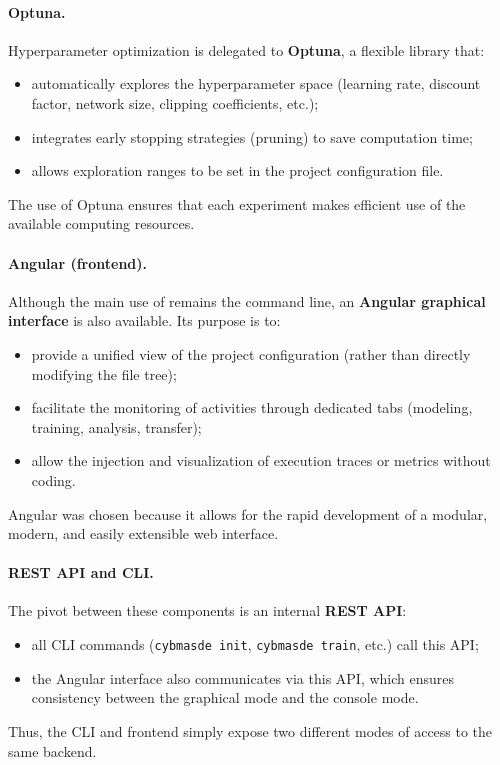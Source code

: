 \paragraph{Optuna.}
Hyperparameter optimization is delegated to \textbf{Optuna}, a flexible library that:
\begin{itemize}
  \item automatically explores the hyperparameter space (learning rate, discount factor, network size, clipping coefficients, etc.);
  \item integrates early stopping strategies (pruning) to save computation time;
  \item allows exploration ranges to be set in the project configuration file.
\end{itemize}
The use of Optuna ensures that each experiment makes efficient use of the available computing resources.

\paragraph{Angular (frontend).}
Although the main use of  remains the command line, an \textbf{Angular graphical interface} is also available.
Its purpose is to:
\begin{itemize}
  \item provide a unified view of the project configuration (rather than directly modifying the file tree);
  \item facilitate the monitoring of activities through dedicated tabs (modeling, training, analysis, transfer);
  \item allow the injection and visualization of execution traces or metrics without coding.
\end{itemize}
Angular was chosen because it allows for the rapid development of a modular, modern, and easily extensible web interface.

\paragraph{REST API and CLI.}
The pivot between these components is an internal \textbf{REST API}:
\begin{itemize}
  \item all CLI commands (\texttt{cybmasde init}, \texttt{cybmasde train}, etc.) call this API;
  \item the Angular interface also communicates via this API, which ensures consistency between the graphical mode and the console mode.
\end{itemize}
Thus, the CLI and frontend simply expose two different modes of access to the same backend.

